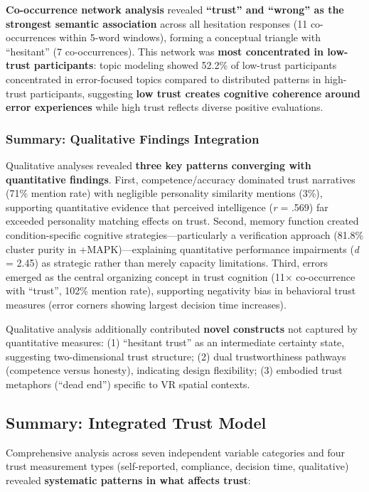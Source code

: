 \documentclass[12pt]{article}
\begin{document}
\textbf{Co-occurrence network analysis} revealed \textbf{``trust'' and ``wrong'' as the strongest semantic association} across all hesitation responses (11 co-occurrences within 5-word windows), forming a conceptual triangle with ``hesitant'' (7 co-occurrences). This network was \textbf{most concentrated in low-trust participants}: topic modeling showed 52.2\% of low-trust participants concentrated in error-focused topics compared to distributed patterns in high-trust participants, suggesting \textbf{low trust creates cognitive coherence around error experiences} while high trust reflects diverse positive evaluations.

\subsubsection{Summary: Qualitative Findings Integration}

Qualitative analyses revealed \textbf{three key patterns converging with quantitative findings}. First, competence/accuracy dominated trust narratives (71\% mention rate) with negligible personality similarity mentions (3\%), supporting quantitative evidence that perceived intelligence (\textit{r} = .569) far exceeded personality matching effects on trust. Second, memory function created condition-specific cognitive strategies—particularly a verification approach (81.8\% cluster purity in +MAPK)—explaining quantitative performance impairments (\textit{d} = 2.45) as strategic rather than merely capacity limitations. Third, errors emerged as the central organizing concept in trust cognition (11× co-occurrence with ``trust'', 102\% mention rate), supporting negativity bias in behavioral trust measures (error corners showing largest decision time increases).

Qualitative analysis additionally contributed \textbf{novel constructs} not captured by quantitative measures: (1) ``hesitant trust'' as an intermediate certainty state, suggesting two-dimensional trust structure; (2) dual trustworthiness pathways (competence versus honesty), indicating design flexibility; (3) embodied trust metaphors (``dead end'') specific to VR spatial contexts.

\subsection{Summary: Integrated Trust Model}

Comprehensive analysis across seven independent variable categories and four trust measurement types (self-reported, compliance, decision time, qualitative) revealed \textbf{systematic patterns in what affects trust}:
\end{document}
